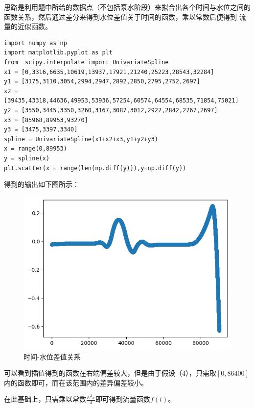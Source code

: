 \documentclass[a4paper]{article}
\begin{document}
思路是利用题中所给的数据点（不包括泵水阶段）来拟合出各个时间与水位之间的函数关系，然后通过差分来得到水位差值关于时间的函数，乘以常数后便得到
流量的近似函数。
\begin{lstlisting}[emph={[3]columns,index,kind,inline,fontsize,x,y,a,b},emphstyle={[3]\color{vscode_parametercolor}},emph={[4]SearchProblem,Callable,Node,Reached,Any,Tuple,List,FoodSearchProblem},emphstyle={[4]\color{vscode_classcolor}}]
import numpy as np
import matplotlib.pyplot as plt
from  scipy.interpolate import UnivariateSpline
x1 = [0,3316,6635,10619,13937,17921,21240,25223,28543,32284]
y1 = [3175,3110,3054,2994,2947,2892,2850,2795,2752,2697]
x2 = [39435,43318,44636,49953,53936,57254,60574,64554,68535,71854,75021]
y2 = [3550,3445,3350,3260,3167,3087,3012,2927,2842,2767,2697]
x3 = [85968,89953,93270]
y3 = [3475,3397,3340]
spline = UnivariateSpline(x1+x2+x3,y1+y2+y3)
x = range(0,89953)
y = spline(x)
plt.scatter(x = range(len(np.diff(y))),y=np.diff(y))
\end{lstlisting}
得到的输出如下图所示：
\begin{figure}[!hb]
    \centering
    \includegraphics{output.png}
    \caption{时间-水位差值关系}
\end{figure}

可以看到插值得到的函数在右端偏差较大，但是由于假设（4），只需取$[0,86400]$内的函数即可，而在该范围内的差异偏差较小。

在此基础上，只需乘以常数$\frac{E^2\pi}{4}$即可得到流量函数$f(t)$。
\newpage
\end{document}
